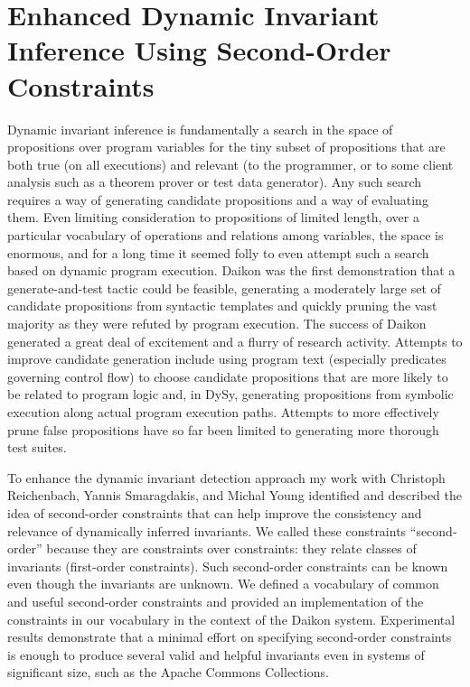 \documentclass[proposal]{umthesis} %
\begin{document}
\section{Enhanced Dynamic Invariant Inference Using Second-Order Constraints}
Dynamic invariant inference is fundamentally a search in the space of propositions over program variables for the tiny subset of propositions that are both true (on all executions) and relevant (to the programmer, or to some client analysis such as a theorem prover or test data generator). Any such search requires a way of generating candidate propositions and a way of evaluating them. Even limiting consideration to propositions of limited length, over a particular vocabulary of operations and relations among variables, the space is enormous, and for a long time it seemed folly to even attempt such a search based on dynamic program execution.  Daikon\cite{ernst99dynamically}  was the first demonstration that a generate-and-test tactic could be feasible, generating a moderately large set of candidate propositions from syntactic templates and quickly pruning the vast majority as they were refuted by program execution.  The success of Daikon generated a great deal of excitement and a flurry of research activity.  Attempts to improve candidate generation include using program text (especially predicates governing control flow) to choose candidate propositions that are more likely to be related to program logic and, in DySy\cite{csallner08dysy}, generating propositions from symbolic execution along actual program execution paths.   Attempts to more effectively prune false propositions have so far been limited to generating more thorough test suites\cite{godefroid05dart,1081750}.

To enhance the dynamic invariant detection approach my work\cite{Li:2013:SCD:2491411.2491457} with Christoph Reichenbach, Yannis Smaragdakis, and Michal Young identified and described the idea of second-order constraints that can help improve the consistency and relevance of dynamically inferred invariants.  We called these constraints “second-order” because they are constraints over constraints: they relate classes of invariants (first-order constraints). Such second-order constraints can be known even though the invariants are unknown.  We defined a vocabulary of common and useful second-order constraints and provided an implementation of the constraints in our vocabulary in the context of the Daikon system.  Experimental results demonstrate that a minimal effort on specifying second-order constraints is enough to produce several valid and helpful invariants even in systems of significant size, such as the Apache Commons Collections.
\end{document}
